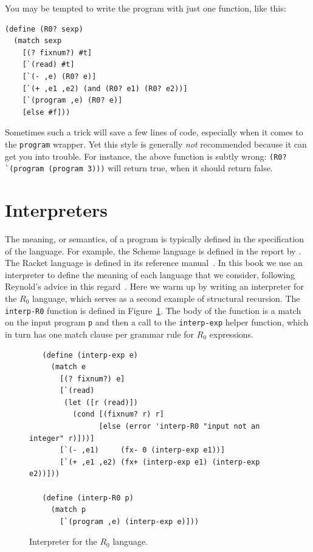 \documentclass[11pt]{book}
\begin{document}
You may be tempted to write the program with just one function, like this:
\begin{center}
\begin{minipage}{0.5\textwidth}
\begin{lstlisting}
(define (R0? sexp)
  (match sexp
    [(? fixnum?) #t]
    [`(read) #t]
    [`(- ,e) (R0? e)]
    [`(+ ,e1 ,e2) (and (R0? e1) (R0? e2))]
    [`(program ,e) (R0? e)]
    [else #f]))
\end{lstlisting}
\end{minipage}
\end{center}
%
Sometimes such a trick will save a few lines of code, especially when it comes
to the {\tt program} wrapper.  Yet this style is generally \emph{not}
recommended because it can get you into trouble.
%
For instance, the above function is subtly wrong:
\lstinline{(R0? `(program (program 3)))} will return true, when it
should return false.



\section{Interpreters}
\label{sec:interp-R0}

The meaning, or semantics, of a program is typically defined in the
specification of the language. For example, the Scheme language is
defined in the report by \cite{SPERBER:2009aa}. The Racket language is
defined in its reference manual~\citep{plt-tr}. In this book we use an
interpreter to define the meaning of each language that we consider,
following Reynold's advice in this
regard~\citep{reynolds72:_def_interp}. Here we warm up by writing an
interpreter for the $R_0$ language, which serves as a second example
of structural recursion. The \texttt{interp-R0} function is defined in
Figure~\ref{fig:interp-R0}. The body of the function is a match on the
input program \texttt{p} and then a call to the \lstinline{interp-exp}
helper function, which in turn has one match clause per grammar rule
for $R_0$ expressions.

\begin{figure}[tbp]
\begin{lstlisting}
   (define (interp-exp e)
     (match e
       [(? fixnum?) e]
       [`(read)
        (let ([r (read)])
          (cond [(fixnum? r) r]
                [else (error 'interp-R0 "input not an integer" r)]))]
       [`(- ,e1)     (fx- 0 (interp-exp e1))]
       [`(+ ,e1 ,e2) (fx+ (interp-exp e1) (interp-exp e2))]))

   (define (interp-R0 p)
     (match p
       [`(program ,e) (interp-exp e)]))
\end{lstlisting}
\caption{Interpreter for the $R_0$ language.}
\label{fig:interp-R0}
\end{figure}
\end{document}
